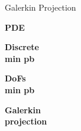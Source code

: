 \begin{frame}{Galerkin Projection}
\begin{center}
\begin{tcolorbox}
			\vspace{5pt}
		
			\begin{minipage}{0.1\linewidth}
				\centering
				\textbf{PDE}
			\end{minipage} \; \hspace{15pt} \; \begin{minipage}{0.1\linewidth}
				\centering
				\textbf{Discrete} \\
				\textbf{min pb}
			\end{minipage} \; \hspace{10pt} \; \begin{minipage}{0.1\linewidth}
				\centering
				\textbf{DoFs} \\
				\textbf{min pb}
			\end{minipage} \; \hspace{60pt} \; \begin{minipage}{0.1\linewidth}
				\centering
				\textbf{Galerkin} \\
				\textbf{projection}
			\end{minipage}
		\end{tcolorbox}
	\end{center}
\end{frame}

